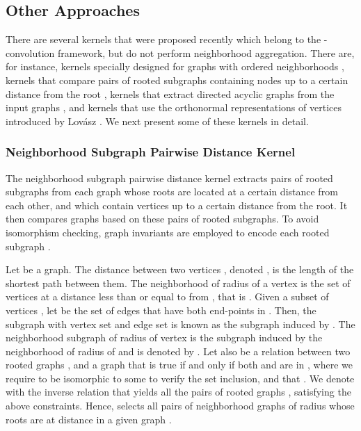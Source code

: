 \documentclass[twoside,11pt]{article}
\begin{document}
\subsection{Other Approaches}
There are several kernels that were proposed recently which belong to the -convolution framework, but do not perform neighborhood aggregation.
There are, for instance, kernels specially designed for graphs with ordered neighborhoods \cite{draief2018kong}, kernels that compare pairs of rooted subgraphs containing nodes up to a certain distance from the root \cite{costa2010fast}, kernels that extract directed acyclic graphs from the input graphs \cite{da2012tree}, and kernels that use the orthonormal representations of vertices introduced by Lov\'asz \cite{johansson2014global}.
We next present some of these kernels in detail.

\subsubsection{Neighborhood Subgraph Pairwise Distance Kernel}
The neighborhood subgraph pairwise distance kernel extracts pairs of rooted subgraphs from each graph whose roots are located at a certain distance from each other, and which contain vertices up to a certain distance from the root.
It then compares graphs based on these pairs of rooted subgraphs.
To avoid isomorphism checking, graph invariants are employed to encode each rooted subgraph \cite{costa2010fast}.

Let  be a graph.
The distance between two vertices , denoted , is the length of the shortest path between them.
The neighborhood of radius  of a vertex  is the set of vertices at a distance less than or equal to  from , that is .
Given a subset of vertices , let  be the set of edges that have both end-points in .
Then, the subgraph with vertex set  and edge set  is known as the subgraph induced by .
The neighborhood subgraph of radius  of vertex  is the subgraph induced by the neighborhood of radius  of  and is denoted by .
Let also  be a relation between two rooted graphs ,  and a graph  that is true if and only if both  and  are in , where we require  to be isomorphic to some  to verify the set inclusion, and that .
We denote with  the inverse relation that yields all the pairs of rooted graphs ,  satisfying the above constraints.
Hence,  selects all pairs of neighborhood graphs of radius  whose roots are at distance  in a given graph .
\end{document}
